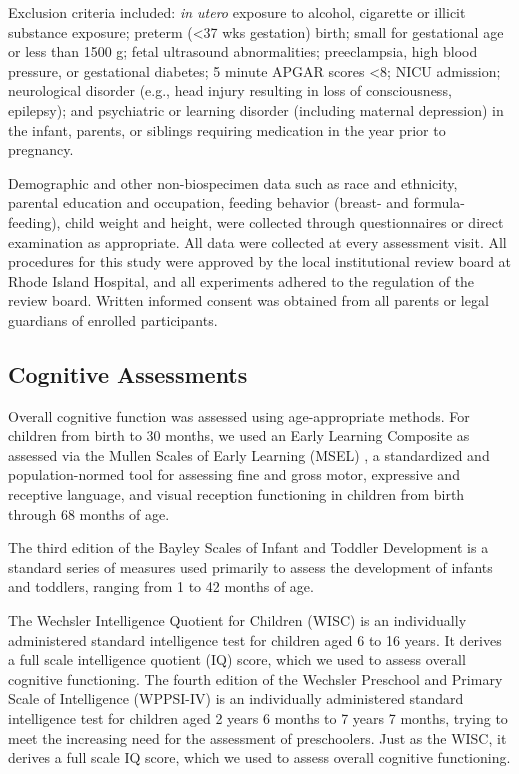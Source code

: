 \documentclass[fleqn,10pt]{wlscirep}
\begin{document}
Exclusion criteria included: \emph{in utero} exposure to alcohol, cigarette or illicit substance exposure;
preterm (<37 wks gestation) birth; small for gestational age or less than 1500 g; fetal ultrasound abnormalities;
preeclampsia, high blood pressure, or gestational diabetes; 5 minute APGAR scores <8;
NICU admission; neurological disorder (e.g., head injury resulting in loss of consciousness, epilepsy);
and psychiatric or learning disorder (including maternal depression) in the infant, parents, or siblings requiring medication in the year prior to pregnancy.

Demographic and other non-biospecimen data such as race and ethnicity, parental education and occupation,
feeding behavior (breast- and formula-feeding), child weight and height,
were collected through questionnaires or direct examination as appropriate.
All data were collected at every assessment visit.
All procedures for this study were approved by the local institutional review board at Rhode Island Hospital,
and all experiments adhered to the regulation of the review board.
Written informed consent was obtained from all parents or legal guardians of enrolled participants.


\subsection*{Cognitive Assessments}

Overall cognitive function was assessed using age-appropriate methods.
For children from birth to 30 months, we used an Early Learning Composite
as assessed via the Mullen Scales of Early Learning (MSEL) \cite{Mullen1995-ty},
a standardized and population-normed tool for assessing fine and gross motor,
expressive and receptive language, and visual reception functioning in children from birth through 68 months of age.

The third edition of the Bayley Scales of Infant and Toddler Development \cite{Bayley2006-wm}
is a standard series of measures used primarily to assess the development of infants and toddlers,
ranging from 1 to 42 months of age.

The Wechsler Intelligence Quotient for Children (WISC) \cite{Wechsler2012-mi}
is an individually administered standard intelligence test for children aged 6 to 16 years.
It derives a full scale intelligence quotient (IQ) score, which we used to assess overall cognitive functioning.
The fourth edition of the Wechsler Preschool and Primary Scale of Intelligence (WPPSI-IV) \cite{Wechsler2012-mi}
is an individually administered standard intelligence test for children aged 2 years 6 months to 7 years 7 months,
trying to meet the increasing need for the assessment of preschoolers.
Just as the WISC, it derives a full scale IQ score, which we used to assess overall cognitive functioning.
\end{document}
